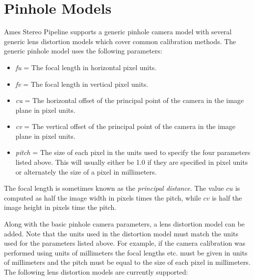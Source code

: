 \chapter{Pinhole Models}
\label{chapter:pinholemodels}


Ames Stereo Pipeline supports a generic pinhole camera model with
several generic lens distortion models which cover common 
calibration methods.  The generic pinhole model uses the following
parameters:   

\begin{itemize}{}
\item  \textit{fu} = The focal length in horizontal pixel units.
\item  \textit{fv} = The focal length in vertical pixel units.
\item  \textit{cu} = The horizontal offset of the principal 
point of the camera in the image plane in pixel units.
\item  \textit{cv} = The vertical offset of the principal 
point of the camera in the image plane in pixel units.
\item  \textit{pitch} = The size of each pixel in the units used to specify
the four parameters listed above.  This will usually either be 1.0 if they
are specified in pixel units or alternately the size of a pixel in millimeters.
\end{itemize}

The focal length is sometimes known as the \textit{principal
distance}. The value $cu$ is computed as half the image width in
pixels times the pitch, while $cv$ is half the image height in pixels
time the pitch.


Along with the basic pinhole camera parameters, a lens distortion model
can be added.  Note that the units used in the distortion model must
match the units used for the parameters listed above.  For example, if the
camera calibration was performed using units of millimeters the focal lengths etc. must be given in
units of millimeters and the pitch must be equal to the size of each pixel in millimeters.
The following lens distortion models are currently supported:


